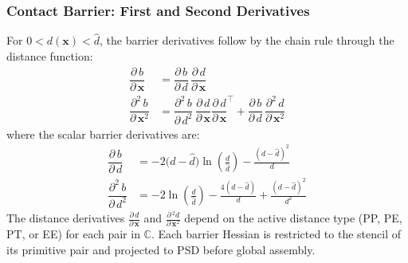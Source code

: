 \documentclass{article}
\newcommand{\pd}[2]{\dfrac{\partial\, #1}{\partial\, #2}}
\newcommand{\pdc}[2]{\frac{\partial #1}{\partial #2}}
\newcommand{\pdv}[2]{\dfrac{\partial^2\, #1}{\partial\, #2^2}}
\begin{document}
\subsubsection{Contact Barrier: First and Second Derivatives}
For $0 < d(\mathbf{x}) < \hat{d}$, the barrier derivatives follow by
the chain rule through the distance function:
\begin{align}
    \pd{b}{\mathbf{x}} &= \pd{b}{d}\,\pd{d}{\mathbf{x}}
    \\[1ex]
    \pdv{b}{\mathbf{x}} &=
    \pdv{b}{d}\,\pd{d}{\mathbf{x}}\pd{d}{\mathbf{x}}^\top +
    \pd{b}{d}\,\pdv{d}{\mathbf{x}}
\end{align}
where the scalar barrier derivatives are:
\begin{align}
    \pd{b}{d} &=
    -2\bigl(d - \hat{d}\bigr)
    \ln\!\left(\frac{d}{\hat{d}}\right)
    - \frac{(d - \hat{d})^2}{d}
    \\[1ex]
    \pdv{b}{d} &=
    -2\ln\!\left(\frac{d}{\hat{d}}\right)
    - \frac{4(d - \hat{d})}{d}
    + \frac{(d - \hat{d})^2}{d^2}
\end{align}
The distance derivatives $\pdc{\,d}{\,\mathbf{x}}$ and
$\pdc{\,^2d}{\,\mathbf{x}^2}$ depend on the active distance type
(PP, PE, PT, or EE) for each pair in $\mathbb{C}$.
Each barrier Hessian is restricted to the stencil of its primitive
pair and projected to PSD before global assembly.

\newpage
\end{document}
